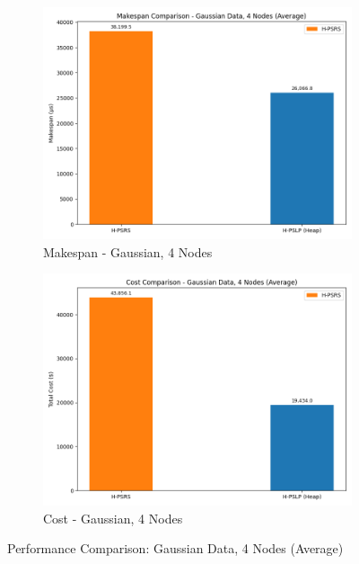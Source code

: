 \documentclass[]{interact}
\theoremstyle{plain}
\theoremstyle{definition}
\theoremstyle{remark}
\begin{document}
\begin{figure}[H]
    \centering
    \begin{subfigure}{0.48\textwidth}
        \includegraphics[width=\textwidth]{src/out_matplotlib_charts/perf_makespan_gaussian_4nodes.png}
        \caption{Makespan - Gaussian, 4 Nodes}
        \label{fig:m3}
    \end{subfigure}
    \hfill
    \begin{subfigure}{0.48\textwidth}
        \includegraphics[width=\textwidth]{src/out_matplotlib_charts/perf_cost_gaussian_4nodes.png}
        \caption{Cost - Gaussian, 4 Nodes}
        \label{fig:m4}
    \end{subfigure}
    \caption{Performance Comparison: Gaussian Data, 4 Nodes (Average)}
    \label{fig:perf_gaussian_4nodes}
\end{figure}
\end{document}
